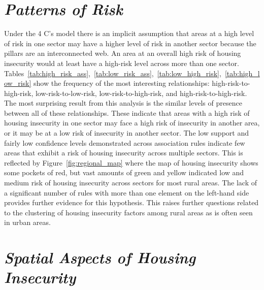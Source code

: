 \section{\textit{Patterns of Risk}}

Under the 4 C's model there is an implicit assumption that areas at a high level of risk in one sector may have a higher level of risk in another sector because the pillars are an interconnected web. An area at an overall high risk of housing insecurity would at least have a high-risk level across more than one sector. Tables~\ref{tab:high_risk_ass},~\ref{tab:low_risk_ass},~\ref{tab:low_high_risk},~\ref{tab:high_low_risk} show the frequency of the most interesting relationships: high-risk-to-high-risk, low-risk-to-low-risk, low-risk-to-high-risk, and high-risk-to-high-risk. The most surprising result from this analysis is the similar levels of presence between all of these relationships. These indicate that areas with a high risk of housing insecurity in one sector may face a high risk of insecurity in another area, or it may be at a low risk of insecurity in another sector. The low support and fairly low confidence levels demonstrated across association rules indicate few areas that exhibit a risk of housing insecurity across multiple sectors. This is reflected by Figure~\ref{fig:regional_map} where the map of housing insecurity shows some pockets of red, but vast amounts of green and yellow indicated low and medium risk of housing insecurity across sectors for most rural areas. The lack of a significant number of rules with more than one element on the left-hand side provides further evidence for this hypothesis. This raises further questions related to the clustering of housing insecurity factors among rural areas as is often seen in urban areas. 

\section{\textit{Spatial Aspects of Housing Insecurity}}

